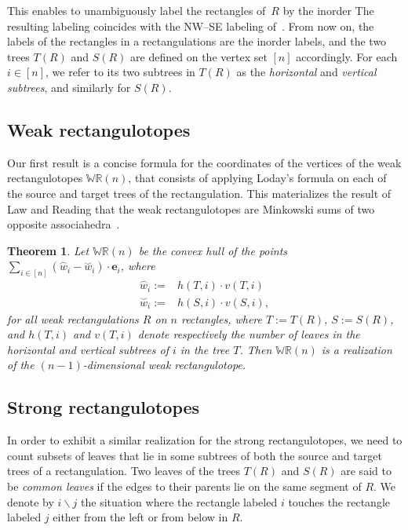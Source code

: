\documentclass{amsart}
\newtheorem{theorem}{Theorem}%
\theoremstyle{definition}
\newcommand{\darkblue}{\color{darkblue}} %
\newcommand{\defn}[1]{\textsl{\darkblue #1}} %
\newcommand{\polytope}[1]{\mathds{#1}} %
\newcommand{\WRP}{\polytope{WR}} %
\newcommand{\loday}[1]{\overset{\frown}{#1}}
\newcommand{\antiloday}[1]{\overset{\smile}{#1}}
\begin{document}
This enables to unambiguously label the rectangles of~$R$ by the inorder 
The resulting labeling coincides with the NW--SE labeling of~\cite{ACFF24}.
From now on, the labels of the rectangles in a rectangulations are the inorder labels, and the two trees $T(R)$ and $S(R)$ are defined on the vertex set $[n]$ accordingly.
For each $i\in [n]$, we refer to its two subtrees in $T(R)$ as the \defn{horizontal} and \defn{vertical subtrees}, and similarly for $S(R)$. 

\subsection{Weak rectangulotopes}

Our first result is a concise formula for the coordinates of the vertices of the  weak rectangulotopes $\WRP(n)$, that consists of applying Loday's formula on each of the source and target trees of the rectangulation. This materializes the result of Law and Reading that the weak rectangulotopes are Minkowski sums of two opposite associahedra~\cite{MR2871762}.

\begin{theorem}
  Let $\WRP (n)$ be the convex hull of the points
  $\sum_{i\in [n]} (\loday{w}_i - \antiloday{w}_i)\cdot \mathbf{e}_i$,
  where
  \[
  \begin{split}
    \loday{w}_i := & h(T, i)\cdot v(T,i) \\
    \antiloday{w}_i := & h(S, i)\cdot v(S,i),
  \end{split}
  \]
  for all weak rectangulations $R$ on $n$ rectangles, where $T:=T(R)$, $S:=S(R)$,
  and $h(T,i)$ and $v(T,i)$ denote respectively the number of leaves in the horizontal and vertical subtrees of $i$ in the tree $T$.
  Then $\WRP (n)$ is a realization of the $(n-1)$-dimensional weak rectangulotope.
\end{theorem}

\subsection{Strong rectangulotopes}

In order to exhibit a similar realization for the strong rectangulotopes, we need to count subsets of leaves that lie in some subtrees of both the source and target trees of a rectangulation.
Two leaves of the trees $T(R)$ and $S(R)$ are said to be \defn{common leaves} if the edges to their parents lie on the same segment of $R$. We denote by %
$i\backslash j$ the situation where the rectangle labeled $i$ touches the rectangle labeled $j$ either from the left or from below in $R$. %
\end{document}
